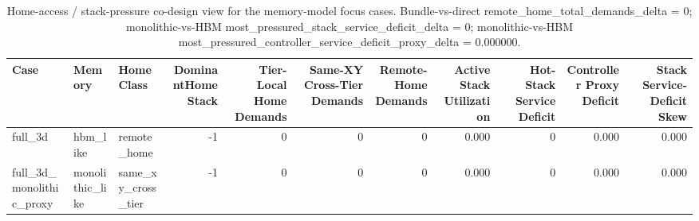 \begin{table}[t]
  \centering
  \caption{Home-access / stack-pressure co-design view for the memory-model focus cases. Bundle-vs-direct remote\_home\_total\_demands\_delta = 0; monolithic-vs-HBM most\_pressured\_stack\_service\_deficit\_delta = 0; monolithic-vs-HBM most\_pressured\_controller\_service\_deficit\_proxy\_delta = 0.000000.}
  \begin{tabular}{l l l r r r r r r r r}
  \hline
  Case & Memory & HomeClass & DominantHomeStack & Tier-Local Home Demands & Same-XY Cross-Tier Demands & Remote-Home Demands & Active Stack Utilization & Hot-Stack Service Deficit & Controller Proxy Deficit & Stack Service-Deficit Skew \\
  \hline
  full\_3d & hbm\_like & remote\_home & -1 & 0 & 0 & 0 & 0.000 & 0 & 0.000 & 0.000 \\
  full\_3d\_monolithic\_proxy & monolithic\_like & same\_xy\_cross\_tier & -1 & 0 & 0 & 0 & 0.000 & 0 & 0.000 & 0.000 \\
  \hline
  \end{tabular}
\end{table}
